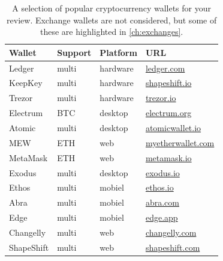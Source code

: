 \begin{table}

\centering

\caption[A selection of cryptocurrency wallets]{A selection of popular cryptocurrency wallets for your review. Exchange wallets are not considered, but some of these are highlighted in \cref{ch:exchanges}.}
\begin{tabular}{llll} 
\toprule

\textbf{Wallet} & \textbf{Support} & \textbf{Platform} & \textbf{URL }\\
\midrule

Ledger          & multi    & hardware   & \href{https://shop.ledger.com/pages/ledger-nano-x?r=1849e3ffabd0}{ledger.com}\\
KeepKey         & multi    & hardware   & \href{http://lddy.no/aczp}{shapeshift.io}\\
Trezor          & multi    & hardware   & \href{https://shop.trezor.io/?offer_id=10&aff_id=3118}{trezor.io}\\
Electrum        & BTC      & desktop    & \href{https://electrum.org/#home}{electrum.org}\\
Atomic          & multi    & desktop    & \href{https://atomicwallet.io/}{atomicwallet.io}\\       
MEW             & ETH      & web        & \href{https://www.myetherwallet.com/}{myetherwallet.com}\\
MetaMask        & ETH      & web        & \href{https://metamask.io/}{metamask.io}\\
Exodus          & multi    & desktop    & \href{https://exodus.io/}{exodus.io}\\
Ethos           & multi    & mobiel     & \href{https://www.ethos.io/universal-wallet/}{ethos.io}\\
Abra            & multi    & mobiel     & \href{https://www.abra.com/}{abra.com}\\
Edge            & multi    & mobiel     & \href{https://edge.app/}{edge.app}\\
Changelly       & multi    & web        & \href{https://changelly.com/}{changelly.com}\\ 
ShapeShift      & multi    & web        & \href{https://shapeshift.com/#top}{shapeshift.com}\\




\bottomrule
\end{tabular}
\label{tab:walletoverview}
\end{table}








